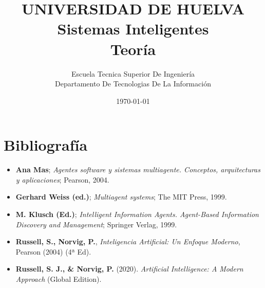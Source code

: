 \documentclass[11pt, a4paper]{report}
\title{%
    \vspace*{2cm}
    {\Large UNIVERSIDAD DE HUELVA}\\[0.5cm] %
    {\huge \textbf{Sistemas Inteligentes}}\\[0.5cm]
    {\Large Teoría}\\[2cm]
}
\author{%
    \vspace{1cm}
    Escuela Tecnica Superior De Ingeniería\\[0.5cm]
    Departamento De Tecnologias De La Información \\[0.5cm]
}
\date{%
    \vspace{2cm}
    \large \today
}
\begin{document}


\tableofcontents
\newpage















\nocite{*}
\newpage
\chapter*{Bibliografía}

\begin{itemize}
    \item \textbf{Ana Mas}; \textit{Agentes software y sistemas multiagente. Conceptos, arquitecturas y aplicaciones}; Pearson, 2004.
        
    \item \textbf{Gerhard Weiss (ed.)}; \textit{Multiagent systems}; The MIT Press, 1999.

    \item \textbf{M. Klusch (Ed.)}; \textit{Intelligent Information Agents. Agent-Based Information Discovery and Management}; Springer Verlag, 1999.

    \item \textbf{Russell, S., Norvig, P.}, \textit{Inteligencia Artificial: Un Enfoque Moderno}, Pearson (2004) (4ª Ed).

    \item \textbf{Russell, S. J., \& Norvig, P.} (2020). \textit{Artificial Intelligence: A Modern Approach} (Global Edition).
\end{itemize}
\end{document}
